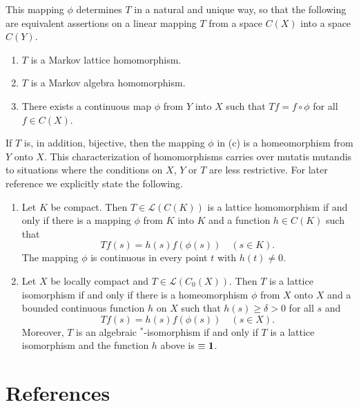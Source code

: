 This mapping $\phi$ determines $T$ in a natural and unique way, so that the following are equivalent assertions on a linear mapping $T$ from a space $C(X)$ into a space $C(Y)$.
\begin{enumerate}[\upshape (a)]
\item 
	$T$ is a Markov lattice homomorphism.
\item 
	$T$ is a Markov algebra homomorphism.
\item 
	There exists a continuous map $\phi$ from $Y$ into $X$ such that $Tf = f \circ \phi$ for all $f \in 	C(X)$.
\end{enumerate}
If\/ $T$ is, in addition, bijective, then the mapping $\phi$ in (c) is a homeomorphism from $Y$ onto $X$.
This characterization of homomorphisms carries over mutatis mutandis to situations where the conditions on $X$, $Y$ or $T$ are less restrictive.
For later reference we explicitly state the following.
\begin{enumerate}[\upshape (i), labelindent=.25em]
\item 
	Let $K$ be compact. Then $ T \in \mathcal{L}(C(K)) $ is a lattice homomorphism if and only if there is a mapping 
$\phi$ from $K$ into $K$ and a function $h \in C(K)$ such that 
%
\[
	Tf(s) = h(s)f(\phi(s)) \quad (s \in K) .
\]
%
The mapping $\phi$ is continuous in every point $t$ with $h(t) \neq 0$.

\item 
Let $X$ be locally compact and $T \in \mathcal{L}(C_{0}(X))$.
Then $T$ is a lattice isomorphism if and only if there is a homeomorphism $\phi$ from $X$ onto $X$ and a bounded continuous function $h$ on $X$ such that $h(s) \geq \delta > 0$ for all $s$ and 
%
\[
	Tf(s) = h(s)f(\phi(s)) \quad (s \in X) .
\]
%
Moreover, $T$ is an algebraic $^{*}$-isomorphism if and only if\/ $T$ is a lattice isomorphism and the function $h$ above is $\equiv \mathbf{1}$.
\end{enumerate}
\section*{References}
{\RaggedRight
\nocite{semadeni:1971}
  \printbibliography[heading=none]
 }
